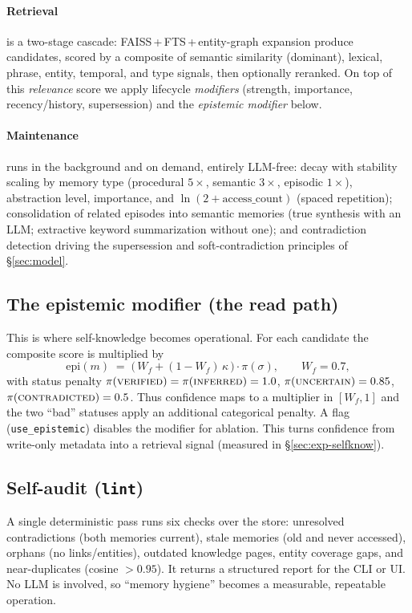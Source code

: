 \documentclass[11pt]{article}
\theoremstyle{definition}
\newcommand{\status}[1]{\textsc{#1}}
\newcommand{\code}[1]{\texttt{#1}}
\begin{document}
\paragraph{Retrieval} is a two-stage cascade: FAISS\,+\,FTS\,+\,entity-graph
expansion produce candidates, scored by a composite of semantic similarity
(dominant), lexical, phrase, entity, temporal, and type signals, then optionally
reranked. On top of this \emph{relevance} score we apply lifecycle
\emph{modifiers} (strength, importance, recency/history, supersession) and the
\emph{epistemic modifier} below.

\paragraph{Maintenance} runs in the background and on demand, entirely LLM-free:
decay with stability scaling by memory type (procedural $5\times$, semantic
$3\times$, episodic $1\times$), abstraction level, importance, and
$\ln(2+\text{access\_count})$ (spaced repetition); consolidation of related
episodes into semantic memories (true synthesis with an LLM; extractive keyword
summarization without one); and contradiction detection driving the supersession
and soft-contradiction principles of \S\ref{sec:model}.

\subsection{The epistemic modifier (the read path)}\label{sec:modifier}
This is where self-knowledge becomes operational. For each candidate the
composite score is multiplied by
\begin{equation}
\mathrm{epi}(m) \;=\; \bigl(\,W_{\!f} + (1-W_{\!f})\,\kappa\,\bigr)\cdot\pi(\sigma),
\qquad W_{\!f}=0.7,
\label{eq:modifier}
\end{equation}
with status penalty $\pi(\status{verified})=\pi(\status{inferred})=1.0$,
$\pi(\status{uncertain})=0.85$, $\pi(\status{contradicted})=0.5$. Thus confidence
maps to a multiplier in $[W_{\!f},1]$ and the two ``bad'' statuses apply an
additional categorical penalty. A flag (\code{use\_epistemic}) disables the
modifier for ablation. This turns confidence from write-only metadata into a
retrieval signal (measured in \S\ref{sec:exp-selfknow}).

\subsection{Self-audit (\code{lint})}\label{sec:lint}
A single deterministic pass runs six checks over the store: unresolved
contradictions (both memories current), stale memories (old and never accessed),
orphans (no links/entities), outdated knowledge pages, entity coverage gaps, and
near-duplicates (cosine $>0.95$). It returns a structured report for the CLI or
UI. No LLM is involved, so ``memory hygiene'' becomes a measurable, repeatable
operation.
\end{document}
